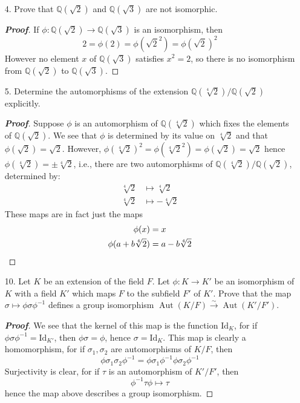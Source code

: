 \documentclass[12pt,leqno]{article}
\theoremstyle{definition}
\newcommand{\Aut}{\operatorname{Aut}}
\newcommand{\Q}{\mathbb{Q}}
\newenvironment{Proof}{\begin{proof}[\textnormal{\textbf{Proof}}]}{\end{proof}}
\begin{document}
\begin{enumerate}
\begin{Proof}
\begin{enumerate}
     \end{enumerate}
    \end{Proof}
   \item [4.] Prove that $\Q(\sqrt{2})$ and $\Q(\sqrt{3})$ are not isomorphic. 
    \begin{Proof}
     If $\phi:\Q(\sqrt{2})\to\Q(\sqrt{3})$ is an isomorphism, then \[2=\phi(2)=\phi(\sqrt{2}^2)=\phi(\sqrt{2})^2\] However no element $x$ of $\Q(\sqrt{3})$ satisfies $x^2=2$, so there is no isomorphism from $\Q(\sqrt{2})$ to $\Q(\sqrt{3})$. 
    \end{Proof}
   \item [5.] Determine the automorphisms of the extension $\Q(\sqrt[4]{2})/\Q(\sqrt{2})$ explicitly.
    \begin{Proof}
     Suppose $\phi$ is an automorphism of $\Q(\sqrt[4]{2})$ which fixes the elements of $\Q(\sqrt{2})$. We see that $\phi$ is determined by its value on $\sqrt[4]{2}$ and that $\phi(\sqrt{2})=\sqrt{2}$. However, $\phi(\sqrt[4]{2})^2=\phi(\sqrt[4]{2}^2)=\phi(\sqrt{2})=\sqrt{2}$ hence $\phi(\sqrt[4]{2})=\pm\sqrt[4]{2}$, i.e., there are two automorphisms of $\Q(\sqrt[4]{2})/\Q(\sqrt{2})$, determined by: \begin{align*}\sqrt[4]{2}&\mapsto\sqrt[4]{2}\\\sqrt[4]{2}&\mapsto-\sqrt[4]{2}\end{align*} These maps are in fact just the maps \begin{align*}\phi(x)&=x\\\phi(a+b\sqrt[4]{2})&=a-b\sqrt[4]{2}\qedhere\end{align*} 
    \end{Proof}
   \item [10.] Let $K$ be an extension of the field $F$. Let $\phi:K\to K'$ be an isomorphism of $K$ with a field $K'$ which maps $F$ to the subfield $F'$ of $K'$. Prove that the map $\sigma\mapsto\phi\sigma\phi^{-1}$ defines a group isomorphism $\Aut(K/F)\stackrel{\sim}{\to}\Aut(K'/F')$. 
    \begin{Proof}
     We see that the kernel of this map is the function $\text{Id}_K$, for if $\phi\sigma\phi^{-1}=\text{Id}_{K'}$, then $\phi\sigma=\phi$, hence $\sigma=\text{Id}_K$. This map is clearly a homomorphism, for if $\sigma_1,\sigma_2$ are automorphisms of $K/F$, then \[\phi\sigma_1\sigma_2\phi^{-1}=\phi\sigma_1\phi^{-1}\phi\sigma_2\phi^{-1}\] Surjectivity is clear, for if $\tau$ is an automorphism of $K'/F'$, then \[\phi^{-1}\tau\phi\mapsto\tau\] hence the map above describes a group isomorphism. 
    \end{Proof}
\end{enumerate}
\end{document}

